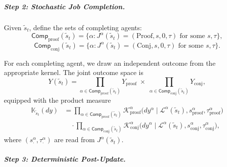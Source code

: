 \subparagraph{Step 2: Stochastic Job Completion.}
 
Given $\tilde s_t$, define the sets of completing agents:
\[
    \mathsf{Comp}_{\mathrm{proof}}(\tilde s_t) = \{\alpha : J^\alpha(\tilde s_t)=(\mathrm{Proof},s,0,\tau)\text{ for some }s,\tau\},
\]
\[
\mathsf{Comp}_{\mathrm{conj}}(\tilde s_t) = \{\alpha : J^\alpha(\tilde s_t)=(\mathrm{Conj},s,0,\tau)\text{ for some }s,\tau\}.
\]
 
For each completing agent, we draw an independent outcome from the appropriate kernel. The joint outcome space is
\[Y(\tilde s_t)
=
\prod_{\alpha\in\mathsf{Comp}_{\mathrm{proof}}(\tilde s_t)} Y_{\mathrm{proof}}
\;\times\;
\prod_{\alpha\in\mathsf{Comp}_{\mathrm{conj}}(\tilde s_t)} Y_{\mathrm{conj}},\]
equipped with the product measure
\begin{align*}
\mathbb K_{\tilde s_t}(dy)
&=
\prod_{\alpha\in\mathsf{Comp}_{\mathrm{proof}}(\tilde s_t)}
\mathcal K^\alpha_{\mathrm{proof}}\!\big(dy^\alpha \mid \mathcal L^\alpha(\tilde s_t), s^\alpha_{\mathrm{proof}},\tau^\alpha_{\mathrm{proof}}\big)
\\&\quad\cdot
\prod_{\alpha\in\mathsf{Comp}_{\mathrm{conj}}(\tilde s_t)}
\mathcal K^\alpha_{\mathrm{conj}}\!\big(dy^\alpha \mid \mathcal L^\alpha(\tilde s_t), s^\alpha_{\mathrm{conj}},\tau^\alpha_{\mathrm{conj}}\big),
\end{align*}
where $(s^\alpha_{\cdot},\tau^\alpha_{\cdot})$ are read from $J^\alpha(\tilde s_t)$.
 
\subparagraph{Step 3: Deterministic Post-Update.}
 
